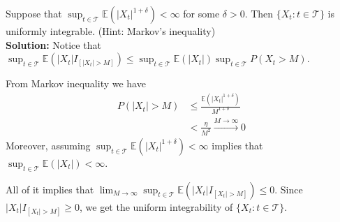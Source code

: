 \documentclass[11pt,letterpaper]{article}                  %
\begin{document}
\bigskip
\begin{problem}

\end{problem}

\bigskip
\begin{problem}
Suppose that $\sup_{t \in \mathcal{T}} \mathbb{E}(|X_t|^{1+\delta}) < \infty$ for some $\delta >0$. Then $\{X_t : t \in \mathcal{T}\}$ is uniformly integrable. (Hint: Markov's inequality) \\

\textbf{Solution:} Notice that $\sup_{t \in \mathcal{T}} \mathbb{E}(|X_t|I_{[|X_t|>M]}) \leq \sup_{t \in \mathcal{T}} \mathbb{E}(|X_t|) \sup_{t \in \mathcal{T}}P(X_t >M)$.

From Markov inequality we have
\begin{align*}
P(|X_t|>M)&\leq \frac{\mathbb{E}(|X_t|^{1+\delta})}{M^{1+\delta}} \\
&< \frac{\eta}{M^2} \overset{M \to \infty}{\longrightarrow} 0
\end{align*}
Moreover, assuming $\sup_{t \in \mathcal{T}} \mathbb{E}(|X_t|^{1+\delta}) < \infty$ implies that $\sup_{t \in \mathcal{T}} \mathbb{E}(|X_t|)<\infty$.

All of it implies that $\lim_{M \to \infty} \sup_{t \in \mathcal{T}} \mathbb{E}(|X_t| I_{[X_t| > M]}) \leq 0$. Since $|X_t| I_{[X_t| > M]}\geq 0$, we get the uniform integrability of $\{X_t : t \in \mathcal{T}\}$.
\end{problem}

\bigskip

\begin{problem}

\end{problem}

\bigskip
\end{document}
